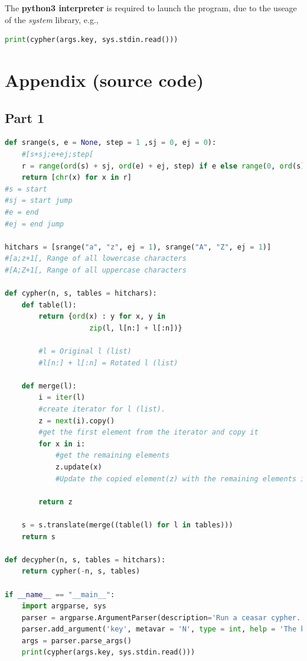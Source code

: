 \documentclass[a4paper,10pt]{article}
\begin{document}
The \textbf{python3 interpreter} is required to launch the program, due to the useage of the \textit{system} library, e.g.,

\begin{lstlisting}[language=python]
print(cypher(args.key, sys.stdin.read()))
\end{lstlisting}

\newpage

\section{Appendix (source code)}

\subsection{Part 1}

\begin{lstlisting}[language=python]
def srange(s, e = None, step = 1 ,sj = 0, ej = 0):
    #[s+sj;e+ej;step[
    r = range(ord(s) + sj, ord(e) + ej, step) if e else range(0, ord(s) + sj, step)
    return [chr(x) for x in r]
#s = start
#sj = start jump
#e = end
#ej = end jump

hitchars = [srange("a", "z", ej = 1), srange("A", "Z", ej = 1)]
#[a;z+1[, Range of all lowercase characters
#[A;Z+1[, Range of all uppercase characters

def cypher(n, s, tables = hitchars):
    def table(l):
        return {ord(x) : y for x, y in
                    zip(l, l[n:] + l[:n])}

        #l = Original l (list)
        #l[n:] + l[:n] = Rotated l (list)

    def merge(l):
        i = iter(l)
        #create iterator for l (list).
        z = next(i).copy()
        #get the first element from the iterator and copy it
        for x in i:
            #get the remaining elements
            z.update(x)
            #Update the copied element(z) with the remaining elements in the iterator

        return z

    s = s.translate(merge((table(l) for l in tables)))
    return s

def decypher(n, s, tables = hitchars):
    return cypher(-n, s, tables)

if __name__ == "__main__":
    import argparse, sys
    parser = argparse.ArgumentParser(description='Run a ceasar cypher.')
    parser.add_argument('key', metavar = 'N', type = int, help = 'The key for shifting the charaters')
    args = parser.parse_args()
    print(cypher(args.key, sys.stdin.read()))
\end{lstlisting}
\newpage
\end{document}
